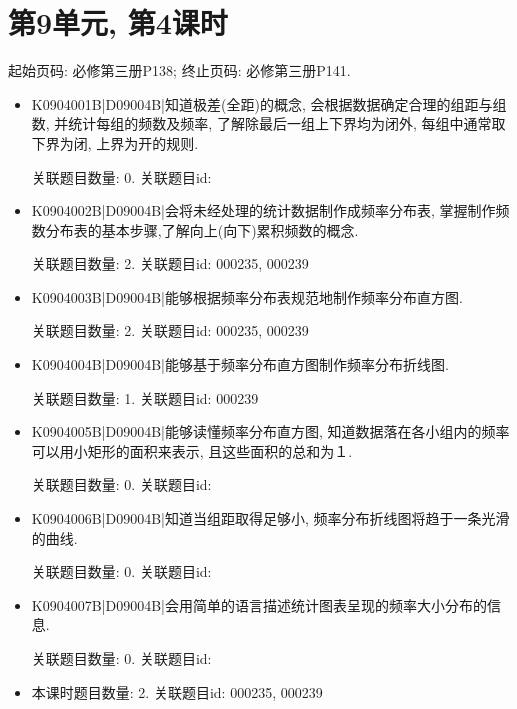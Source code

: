 \section*{第9单元, 第4课时}
起始页码: 必修第三册P138; 终止页码: 必修第三册P141.
\begin{itemize}
\item K0904001B|D09004B|知道极差(全距)的概念, 会根据数据确定合理的组距与组数, 并统计每组的频数及频率, 了解除最后一组上下界均为闭外, 每组中通常取下界为闭, 上界为开的规则.

关联题目数量: 0. 关联题目id: 

\item K0904002B|D09004B|会将未经处理的统计数据制作成频率分布表, 掌握制作频数分布表的基本步骤,了解向上(向下)累积频数的概念.

关联题目数量: 2. 关联题目id: 000235, 000239

\item K0904003B|D09004B|能够根据频率分布表规范地制作频率分布直方图.

关联题目数量: 2. 关联题目id: 000235, 000239

\item K0904004B|D09004B|能够基于频率分布直方图制作频率分布折线图.

关联题目数量: 1. 关联题目id: 000239

\item K0904005B|D09004B|能够读懂频率分布直方图, 知道数据落在各小组内的频率可以用小矩形的面积来表示, 且这些面积的总和为１.

关联题目数量: 0. 关联题目id: 

\item K0904006B|D09004B|知道当组距取得足够小, 频率分布折线图将趋于一条光滑的曲线.

关联题目数量: 0. 关联题目id: 

\item K0904007B|D09004B|会用简单的语言描述统计图表呈现的频率大小分布的信息.

关联题目数量: 0. 关联题目id: 

\item 本课时题目数量: 2. 关联题目id: 000235, 000239

\end{itemize}

